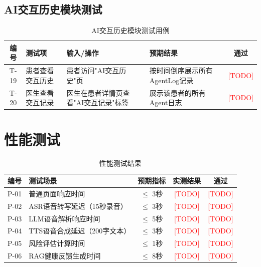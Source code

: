 \subsection{AI交互历史模块测试}

\begin{table}[H]
\centering
\caption{AI交互历史模块测试用例}
\label{tab:test-ai-history}
\begin{tabularx}{\textwidth}{|c|l|X|X|c|}
\hline
\textbf{编号} & \textbf{测试项} & \textbf{输入/操作} & \textbf{预期结果} & \textbf{通过} \\
\hline
T-19 & 患者查看交互历史 & 患者访问"AI交互历史"页 & 按时间倒序展示所有AgentLog记录 & \textcolor{red}{[TODO]} \\
\hline
T-20 & 医生查看交互记录 & 医生在患者详情页查看"AI交互记录"标签 & 展示该患者的所有Agent日志 & \textcolor{red}{[TODO]} \\
\hline
\end{tabularx}
\end{table}

\section{性能测试}

\begin{table}[H]
\centering
\caption{性能测试结果}
\label{tab:test-perf}
\begin{tabularx}{\textwidth}{|c|X|c|c|c|}
\hline
\textbf{编号} & \textbf{测试场景} & \textbf{预期指标} & \textbf{实测结果} & \textbf{通过} \\
\hline
P-01 & 普通页面响应时间 & $\leq$ 3秒 & \textcolor{red}{[TODO]} & \textcolor{red}{[TODO]} \\
\hline
P-02 & ASR语音转写延迟（15秒录音） & $\leq$ 3秒 & \textcolor{red}{[TODO]} & \textcolor{red}{[TODO]} \\
\hline
P-03 & LLM语音解析响应时间 & $\leq$ 5秒 & \textcolor{red}{[TODO]} & \textcolor{red}{[TODO]} \\
\hline
P-04 & TTS语音合成延迟（200字文本） & $\leq$ 3秒 & \textcolor{red}{[TODO]} & \textcolor{red}{[TODO]} \\
\hline
P-05 & 风险评估计算时间 & $\leq$ 1秒 & \textcolor{red}{[TODO]} & \textcolor{red}{[TODO]} \\
\hline
P-06 & RAG健康反馈生成时间 & $\leq$ 8秒 & \textcolor{red}{[TODO]} & \textcolor{red}{[TODO]} \\
\hline
\end{tabularx}
\end{table}

